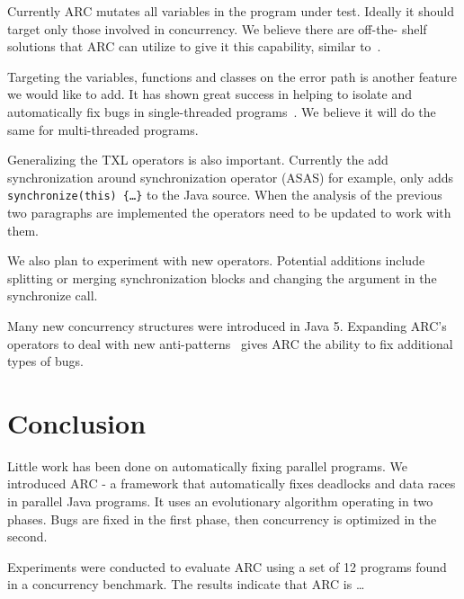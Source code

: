 \documentclass{llncs}
\begin{document}
Currently ARC mutates all variables in the program under test. Ideally it
should target only those involved in concurrency. We believe there are off-the-
shelf solutions that ARC can utilize to give it this capability, similar
to~\cite{CM08, HP00}.

Targeting the variables, functions and classes on the error path is another
feature we would like to add. It has shown great success in helping to isolate
and automatically fix bugs in single-threaded programs~\cite{FNWG09, NWLF09,
WFGN10, GNFW11}. We believe it will do the same for multi-threaded programs.

Generalizing the TXL operators is also important. Currently the add
synchronization around synchronization operator (ASAS) for example, only adds
\texttt{synchronize(this) \{\ldots\}} to the Java source. When the analysis of the
previous two paragraphs are implemented the operators need to be updated to
work with them.

We also plan to experiment with new operators. Potential additions include
splitting or merging synchronization blocks and changing the argument in the
synchronize call.

Many new concurrency structures were introduced in Java 5. Expanding ARC's
operators to deal with new anti-patterns~\cite{BJ09, BCD06} gives ARC the
ability to fix additional types of bugs.

\section{Conclusion}
\label{sec:conclusion}

Little work has been done on automatically fixing parallel programs. We
introduced ARC - a framework that automatically fixes deadlocks and data races
in parallel Java programs. It uses an evolutionary algorithm operating in two
phases. Bugs are fixed in the first phase, then concurrency is optimized in the
second.

Experiments were conducted to evaluate ARC using a set of 12 programs found in
a concurrency benchmark. The results indicate that ARC is \ldots %



\end{document}
